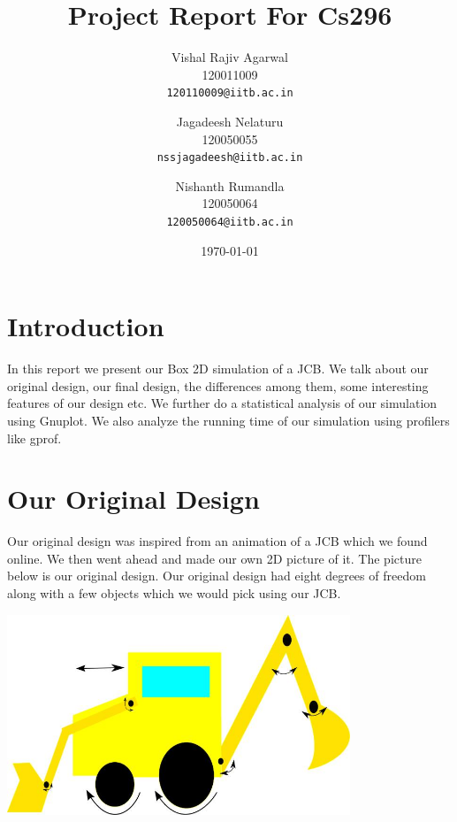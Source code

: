 \documentclass[11pt]{article}
\begin{document}
\title{Project Report For Cs296}

\author{
	Vishal Rajiv Agarwal\\
	120011009\\
	\texttt{120110009@iitb.ac.in}
	\and
	Jagadeesh Nelaturu\\
	120050055\\
	\texttt{nssjagadeesh@iitb.ac.in}
	\and
	Nishanth Rumandla\\
	120050064\\
	\texttt{120050064@iitb.ac.in}}

\date{\today}

\maketitle

\section{Introduction}
	In this report we present our Box 2D simulation of a JCB. We talk about our original design, our final design, the differences among them, some interesting features of our design etc. We further do a statistical analysis of our simulation using Gnuplot. We also analyze the running time of our simulation using profilers like gprof.  
\section{Our Original Design}
	Our original design was inspired from an animation of a JCB which we found online. We then went ahead and made our own 2D picture of it. The picture below is our original design. Our original design had eight degrees of freedom along with a few objects which we would pick using our JCB. 
	\begin{center}\includegraphics[height=6cm]{BullDozerDesign.jpg}\end{center}
\end{document}
